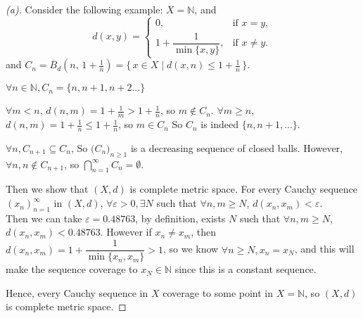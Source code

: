 \begin{proof}[(a)]
    Consider the following example:
    $X = \mathbb{N}$, and 
    \[
    d(x,y)=
    \begin{cases}
    0, & \text{if } x=y,\\[4pt]
    1+\dfrac{1}{\min\{x,y\}}, & \text{if } x\ne y .
    \end{cases}
    \]
    and $C_n = \overline{B}_d\!\left(n,\,1+\frac{1}{n}\right) = \{\, x \in X \mid d(x,n) \le 1+\tfrac{1}{n} \,\}$.
    \begin{claim}
        $\forall n \in \mathbb{N}, C_n = \{n, n+1, n+2...\}$
    \end{claim}
    \begin{explanation}
        $\forall m < n$, $d(n,m) = 1 + \frac{1}{m} > 1 + \frac{1}{n}$, so $m \notin C_n$.
        $\forall m \geq n$, $d(n,m) = 1 + \frac{1}{n} \leq 1 + \frac{1}{n}$, so $m \in C_n$
        So $C_n$ is indeed $\{n, n+1, ...\}$.
    \end{explanation}
    
    $\forall n, C_{n+1} \subseteq C_{n}$, So $\bigl(C_n)_{n\ge 1}$ is a decreasing sequence of closed balls. However, $\forall n, n \notin C_{n+1}$, so $\bigcap_{n=1}^{\infty} C_n = \emptyset$.

    Then we show that $(X, d)$ is complete metric space.
    For every Cauchy sequence $(x_n)_{n=1}^\infty$ in $(X, d)$, $\forall \varepsilon > 0, \exists N$ such that $\forall n,m \geq N$, $d(x_n, x_m) < \varepsilon$. \\
    Then we can take $\varepsilon = 0.48763$, by definition, exists $N$ such that $\forall n,m \geq N$, $d(x_n, x_m) < 0.48763$. However if $x_n \neq x_m$, then $d(x_n,x_m) = 1 + \dfrac{1}{\min\{x_n,x_m\}} > 1$, so we know $\forall n \geq N, x_n = x_N$, and this will make the sequence coverage to $x_N \in \mathbb{N}$ since this is a constant sequence.

    Hence, every Cauchy sequence in $X$ coverage to some point in $X = \mathbb{N}$, so $(X, d)$ is complete metric space.
    
\end{proof}

